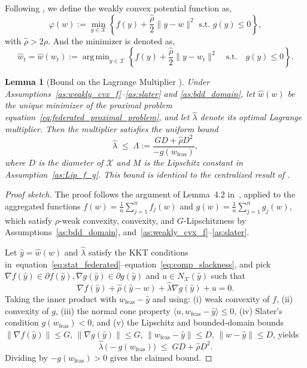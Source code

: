 \documentclass{article} %
\newtheorem{lemma}[]{Lemma}
\DeclareMathOperator*{\argmin}{arg\,min}
\def\eqref#1{equation~\ref{#1}}
\begin{document}
Following \cite{huang2023oracle}, we define the weakly convex potential function as, 
$$\varphi(w) := \min_{y\in\mathcal{X}}\left\{f(y)+\frac{\hat{\rho}}{2}\|y-w\|^2 \text{ s.t. } g(y) \le 0\right\},$$ with $\hat{\rho} > 2\rho.$ And the minimizer is denoted as, 
\[
\hat{w}_t = \hat{w}(w_t):=\argmin_{y\in\mathcal{X}}
\left\{
f(y) + \frac{\hat{\rho}}{2}\|y-w_t\|^2 
\quad \text{s.t.}\quad g(y)\le 0
\right\}.
\]
\begin{lemma}[Bound on the Lagrange Multiplier {\cite{huang2023oracle}}]
\label{lem:lambda_bound_federated}
Under Assumptions~\ref{as:weakly_cvx_f}--\ref{as:slater} and
\ref{as:bdd_domain}, let $\hat w(w)$ be the unique minimizer of the proximal problem
\eqref{eq:federated_proximal_problem}, and let $\hat\lambda$ denote its 
optimal Lagrange multiplier.  
Then the multiplier satisfies the uniform bound
\begin{equation}
    \hat\lambda 
    \;\le\;
    \Lambda
    :=
    \frac{G D + \hat\rho D^2}
         {-g(w_{\mathrm{feas}})},
\end{equation}
where $D$ is the diameter of $\mathcal{X}$ and 
$M$ is the Lipschitz constant in Assumption~\ref{as:Lip_f_g}.  
This bound is identical to the centralized result of \cite{huang2023oracle}.
\end{lemma}
\begin{proof}[Proof sketch]
The proof follows the argument of Lemma~4.2 in~\cite{huang2023oracle},
applied to the aggregated functions
\(
f(w) = \tfrac{1}{n}\sum_{j=1}^n f_j(w)
\)
and
\(
g(w) = \tfrac{1}{n}\sum_{j=1}^n g_j(w)
\),
which satisfy $\rho$-weak convexity, convexity, and $G$-Lipschitzness by
Assumptions~\ref{as:bdd_domain}, and~\ref{as:weakly_cvx_f}--\ref{as:slater}.

Let $\hat y = \hat w(w)$ and $\hat\lambda$ satisfy the KKT conditions
in~\eqref{eq:stat_federated}--\eqref{eq:comp_slackness}, and pick
\(
\nabla f(\hat{y}) \in \partial f(\hat y),
\nabla g(\hat{y})\in \partial g(\hat y)
\)
and
$u\in N_{\mathcal{X}}(\hat y)$ such that
\[
    \nabla f(\hat{y}) + \hat\rho(\hat y - w) + \hat\lambda \nabla g(\hat{y}) + u = 0.
\]
Taking the inner product with $w_{\mathrm{feas}} - \hat y$ and using:
(i) weak convexity of $f$,
(ii) convexity of $g$,
(iii) the normal cone property
$\langle u, w_{\mathrm{feas}} - \hat y\rangle \le 0$,
(iv) Slater's condition $g(w_{\mathrm{feas}})<0$,
and (v) the Lipschitz and bounded-domain bounds
$\|\nabla f(\hat{y})\|\le G$, $\|\nabla g(\hat{y})\|\le G$, $\|w_{\mathrm{feas}}-\hat y\|\le D$,
$\|w-\hat y\|\le D$,
yields
\[
    \hat\lambda \, \bigl(-g(w_{\mathrm{feas}})\bigr)
    \;\le\;
    G D + \hat\rho D^2.
\]
Dividing by $-g(w_{\mathrm{feas}})>0$ gives the claimed bound.
\end{proof}
\end{document}
